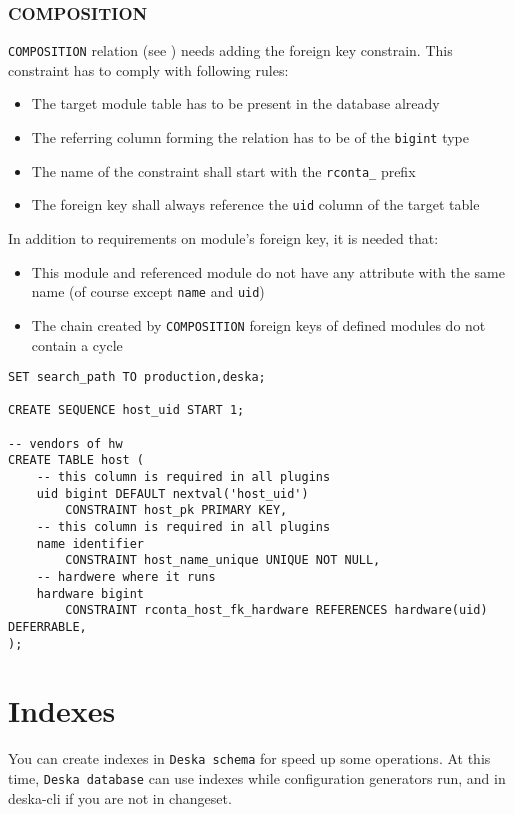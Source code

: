 \documentclass[deska]{subfiles}
\begin{document}
\subsubsection{COMPOSITION}
{\tt COMPOSITION} relation (see ) needs adding the foreign key constrain. This constraint has to comply with following rules:
\begin{itemize}
    \item The target module table has to be present in the database already
    \item The referring column forming the relation has to be of the {\tt bigint} type
    \item The name of the constraint shall start with the {\tt rconta\_} prefix
    \item The foreign key shall always reference the {\tt uid} column of the target table
\end{itemize}
In addition to requirements on module's foreign key, it is needed that:
\begin{itemize}
    \item This module and referenced module do not have any attribute with the same name (of course except {\tt name} and {\tt uid})
    \item The chain created by {\tt COMPOSITION} foreign keys of defined modules do not contain a cycle
\end{itemize}

\begin{verbatim}
SET search_path TO production,deska;

CREATE SEQUENCE host_uid START 1;

-- vendors of hw
CREATE TABLE host (
    -- this column is required in all plugins
    uid bigint DEFAULT nextval('host_uid')
        CONSTRAINT host_pk PRIMARY KEY,
    -- this column is required in all plugins
    name identifier
        CONSTRAINT host_name_unique UNIQUE NOT NULL,
    -- hardwere where it runs
    hardware bigint
        CONSTRAINT rconta_host_fk_hardware REFERENCES hardware(uid) DEFERRABLE,
);
\end{verbatim}

\section{Indexes}
You can create indexes in {\tt Deska schema} for speed up some operations.
At this time, {\tt Deska database} can use indexes while configuration generators run,
and in deska-cli if you are not in changeset.
\end{document}

